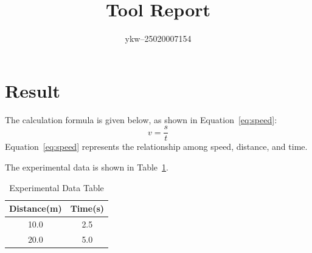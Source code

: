 \documentclass{article}
\begin{document}
\title{Tool Report}
\author{ykw--25020007154}
\maketitle
\section{Result}

The calculation formula is given below, as shown in Equation~\eqref{eq:speed}:
\begin{equation}
v = \frac{s}{t}
\label{eq:speed}
\end{equation}
Equation~\eqref{eq:speed} represents the relationship among speed, distance, and time.

The experimental data is shown in Table~\ref{tab:data}.
\begin{table}[htbp]
  \centering
  \caption{Experimental Data Table}
  \label{tab:data}
  \begin{tabular}{cc}
    \toprule
    Distance(m) & Time(s) \\
    \midrule
    10.0 & 2.5 \\
    20.0 & 5.0 \\
    \bottomrule
  \end{tabular}
\end{table}
\end{document}

